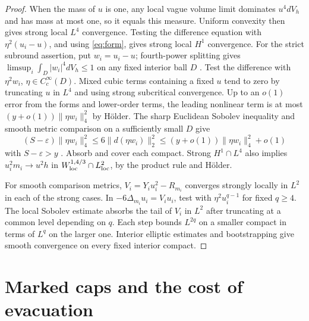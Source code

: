 \documentclass[11pt]{article}
\theoremstyle{definition}
\theoremstyle{remark}
\begin{document}
\begin{proof}
When the mass of \(u\) is one, any local vague volume limit dominates \(u^4dV_h\) and has mass at most one, so it equals this measure. Uniform convexity then gives strong local \(L^4\) convergence. Testing the difference equation with \(\eta^2(u_i-u)\), and using \eqref{eq:form}, gives strong local \(H^1\) convergence. For the strict subround assertion, put \(w_i=u_i-u\); fourth-power splitting gives \(\limsup_i\int_D|w_i|^4dV_h\le1\) on any fixed interior ball \(D\) \cite{BrezisLieb1983Functional}. Test the difference with \(\eta^2w_i\), \(\eta\in C_c^\infty(D)\). Mixed cubic terms containing a fixed \(u\) tend to zero by truncating \(u\) in \(L^4\) and using strong subcritical convergence. Up to an \(o(1)\) error from the forms and lower-order terms, the leading nonlinear term is at most \((y+o(1))\|\eta w_i\|_4^2\) by H\"older. The sharp Euclidean Sobolev inequality and smooth metric comparison on a sufficiently small \(D\) give
\[
 (S-\varepsilon)\|\eta w_i\|_4^2
    \le 6\|d(\eta w_i)\|_2^2
    \le (y+o(1))\|\eta w_i\|_4^2+o(1)
\]
with \(S-\varepsilon>y\) \cite[Theorem 3.3]{LeeParker1987Yamabe}\cite{Talenti1976BestConstant}. Absorb and cover each compact. Strong \(H^1\cap L^4\) also implies \(u_i^2m_i\to u^2h\) in \(W^{1,4/3}_{\rm loc}\cap L^2_{\rm loc}\), by the product rule and H\"older.

For smooth comparison metrics, \(V_i=Y_i u_i^2-R_{m_i}\) converges strongly locally in \(L^2\) in each of the strong cases. In \(-6\Delta_{m_i}u_i=V_i u_i\), test with \(\eta^2u_i^{q-1}\) for fixed \(q\ge4\). The local Sobolev estimate absorbs the tail of \(V_i\) in \(L^2\) after truncating at a common level depending on \(q\). Each step bounds \(L^{2q}\) on a smaller compact in terms of \(L^q\) on the larger one. Interior elliptic estimates and bootstrapping give smooth convergence on every fixed interior compact.
\end{proof}

\section{Marked caps and the cost of evacuation}\label{sec:cap}
\end{document}
